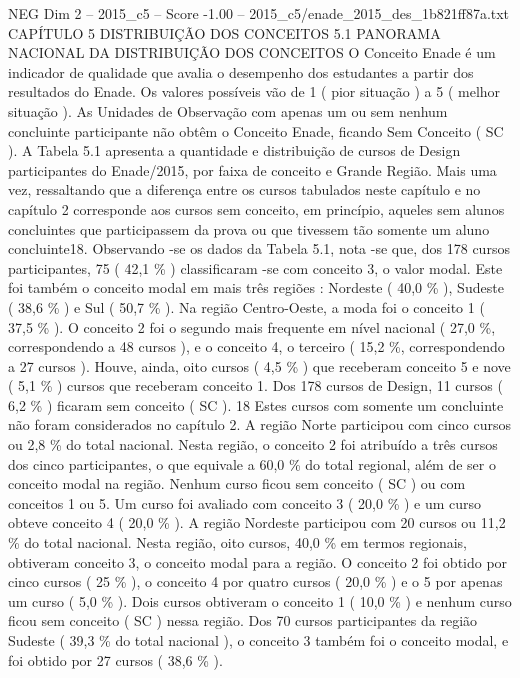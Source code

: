 \begin{textsample}{NEG Dim 2 – 2015\_c5 – Score -1.00 – 2015\_c5/enade\_2015\_des\_1b821ff87a.txt}  \label{ex:f2_neg_153}
CAPÍTULO 5 DISTRIBUIÇÃO DOS CONCEITOS 5.1 PANORAMA NACIONAL DA DISTRIBUIÇÃO DOS CONCEITOS O Conceito Enade é um indicador de qualidade que avalia o desempenho dos estudantes a partir dos resultados do Enade.
Os valores possíveis vão de 1 ( pior situação ) a 5 ( melhor situação ).
As Unidades de Observação com apenas um ou sem nenhum concluinte participante não obtêm o Conceito Enade, ficando Sem Conceito ( SC ).
A Tabela 5.1 apresenta a quantidade e distribuição de cursos de Design participantes do Enade/2015, por faixa de conceito e Grande Região.
Mais uma vez, ressaltando que a diferença entre os cursos tabulados neste capítulo e no capítulo 2 corresponde aos cursos sem conceito, em princípio, aqueles sem alunos concluintes que participassem da prova ou que tivessem tão somente um aluno concluinte18.
Observando -se os dados da Tabela 5.1, nota -se que, dos 178 cursos participantes, 75 ( 42,1 \% ) classificaram -se com conceito 3, o valor modal.
Este foi também o conceito modal em mais três regiões : Nordeste ( 40,0 \% ), Sudeste ( 38,6 \% ) e Sul ( 50,7 \% ).
Na região Centro-Oeste, a moda foi o conceito 1 ( 37,5 \% ).
O conceito 2 foi o segundo mais frequente em nível nacional ( 27,0 \%, correspondendo a 48 cursos ), e o conceito 4, o terceiro ( 15,2 \%, correspondendo a 27 cursos ).
Houve, ainda, oito cursos ( 4,5 \% ) que receberam conceito 5 e nove ( 5,1 \% ) cursos que receberam conceito 1.
Dos 178 cursos de Design, 11 cursos ( 6,2 \% ) ficaram sem conceito ( SC ). 18 Estes cursos com somente um concluinte não foram considerados no capítulo 2.
A região Norte participou com cinco cursos ou 2,8 \% do total nacional.
Nesta região, o conceito 2 foi atribuído a três cursos dos cinco participantes, o que equivale a 60,0 \% do total regional, além de ser o conceito modal na região.
Nenhum curso ficou sem conceito ( SC ) ou com conceitos 1 ou 5.
Um curso foi avaliado com conceito 3 ( 20,0 \% ) e um curso obteve conceito 4 ( 20,0 \% ).
A região Nordeste participou com 20 cursos ou 11,2 \% do total nacional.
Nesta região, oito cursos, 40,0 \% em termos regionais, obtiveram conceito 3, o conceito modal para a região.
O conceito 2 foi obtido por cinco cursos ( 25 \% ), o conceito 4 por quatro cursos ( 20,0 \% ) e o 5 por apenas um curso ( 5,0 \% ).
Dois cursos obtiveram o conceito 1 ( 10,0 \% ) e nenhum curso ficou sem conceito ( SC ) nessa região.
Dos 70 cursos participantes da região Sudeste ( 39,3 \% do total nacional ), o conceito 3 também foi o conceito modal, e foi obtido por 27 cursos ( 38,6 \% ).

\end{textsample}
